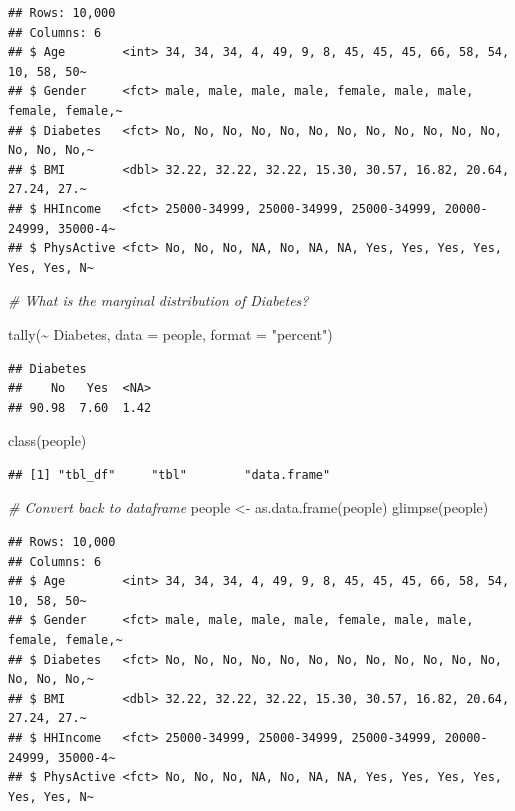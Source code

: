 \documentclass[
]{article}
\newenvironment{Shaded}{\begin{snugshade}}{\end{snugshade}}
\newcommand{\AttributeTok}[1]{\textcolor[rgb]{0.77,0.63,0.00}{#1}}
\newcommand{\CommentTok}[1]{\textcolor[rgb]{0.56,0.35,0.01}{\textit{#1}}}
\newcommand{\FunctionTok}[1]{\textcolor[rgb]{0.00,0.00,0.00}{#1}}
\newcommand{\NormalTok}[1]{#1}
\newcommand{\OtherTok}[1]{\textcolor[rgb]{0.56,0.35,0.01}{#1}}
\newcommand{\SpecialCharTok}[1]{\textcolor[rgb]{0.00,0.00,0.00}{#1}}
\newcommand{\StringTok}[1]{\textcolor[rgb]{0.31,0.60,0.02}{#1}}
\begin{document}
\begin{verbatim}
## Rows: 10,000
## Columns: 6
## $ Age        <int> 34, 34, 34, 4, 49, 9, 8, 45, 45, 45, 66, 58, 54, 10, 58, 50~
## $ Gender     <fct> male, male, male, male, female, male, male, female, female,~
## $ Diabetes   <fct> No, No, No, No, No, No, No, No, No, No, No, No, No, No, No,~
## $ BMI        <dbl> 32.22, 32.22, 32.22, 15.30, 30.57, 16.82, 20.64, 27.24, 27.~
## $ HHIncome   <fct> 25000-34999, 25000-34999, 25000-34999, 20000-24999, 35000-4~
## $ PhysActive <fct> No, No, No, NA, No, NA, NA, Yes, Yes, Yes, Yes, Yes, Yes, N~
\end{verbatim}

\begin{Shaded}
\begin{Highlighting}[]
\CommentTok{\# What is the marginal distribution of Diabetes?}

\FunctionTok{tally}\NormalTok{(}\SpecialCharTok{\textasciitilde{}}\NormalTok{ Diabetes, }\AttributeTok{data =}\NormalTok{ people, }\AttributeTok{format =} \StringTok{"percent"}\NormalTok{)}
\end{Highlighting}
\end{Shaded}

\begin{verbatim}
## Diabetes
##    No   Yes  <NA> 
## 90.98  7.60  1.42
\end{verbatim}

\begin{Shaded}
\begin{Highlighting}[]
\FunctionTok{class}\NormalTok{(people)}
\end{Highlighting}
\end{Shaded}

\begin{verbatim}
## [1] "tbl_df"     "tbl"        "data.frame"
\end{verbatim}

\begin{Shaded}
\begin{Highlighting}[]
\CommentTok{\# Convert back to dataframe}
\NormalTok{people }\OtherTok{\textless{}{-}} \FunctionTok{as.data.frame}\NormalTok{(people)}
\FunctionTok{glimpse}\NormalTok{(people)}
\end{Highlighting}
\end{Shaded}

\begin{verbatim}
## Rows: 10,000
## Columns: 6
## $ Age        <int> 34, 34, 34, 4, 49, 9, 8, 45, 45, 45, 66, 58, 54, 10, 58, 50~
## $ Gender     <fct> male, male, male, male, female, male, male, female, female,~
## $ Diabetes   <fct> No, No, No, No, No, No, No, No, No, No, No, No, No, No, No,~
## $ BMI        <dbl> 32.22, 32.22, 32.22, 15.30, 30.57, 16.82, 20.64, 27.24, 27.~
## $ HHIncome   <fct> 25000-34999, 25000-34999, 25000-34999, 20000-24999, 35000-4~
## $ PhysActive <fct> No, No, No, NA, No, NA, NA, Yes, Yes, Yes, Yes, Yes, Yes, N~
\end{verbatim}
\end{document}

